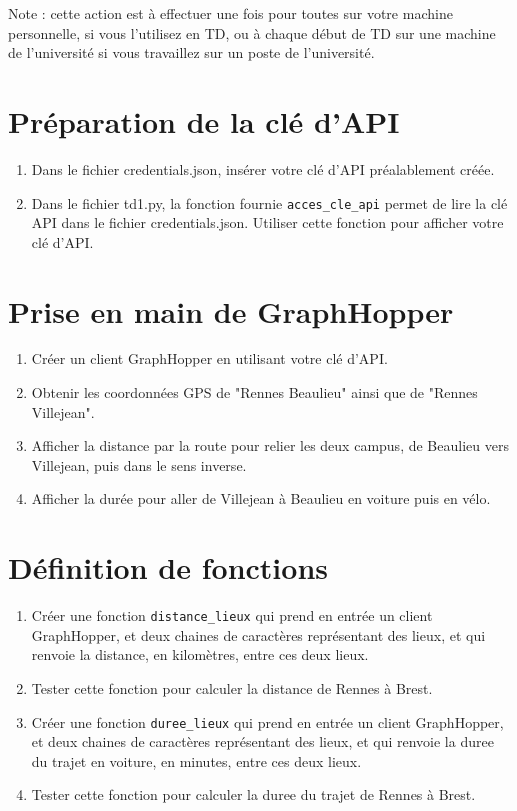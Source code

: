 \documentclass[11pt,a4paper]{article}
\begin{document}
Note : cette action est à effectuer une fois pour toutes sur votre machine personnelle, si vous l’utilisez en TD, ou à chaque début de TD sur une machine de l’université si vous travaillez sur un poste de l’université.

\section{Préparation de la clé d'API}
\begin{enumerate}
    \item Dans le fichier credentials.json, insérer votre clé d'API préalablement créée.
    \item Dans le fichier td1.py, la fonction fournie \verb+acces_cle_api+ permet de lire la clé API dans le fichier credentials.json. 
    Utiliser cette fonction pour afficher votre clé d'API.
\end{enumerate}
        
\section{Prise en main de GraphHopper}
\begin{enumerate}
    \item Créer un client GraphHopper en utilisant votre clé d'API.
    \item Obtenir les coordonnées GPS de "Rennes Beaulieu" ainsi que de "Rennes Villejean".
    \item Afficher la distance par la route pour relier les deux campus, de Beaulieu vers Villejean, puis dans le sens inverse.
    \item Afficher la durée pour aller de Villejean à Beaulieu en voiture puis en vélo. 
\end{enumerate}

\section{Définition de fonctions}
\begin{enumerate}
    \item Créer une fonction \verb+distance_lieux+ qui prend en entrée un client GraphHopper, et deux chaines de caractères représentant des lieux, et qui renvoie la distance, en kilomètres, entre ces deux lieux.
    \item Tester cette fonction pour calculer la distance de Rennes à Brest.
    \item Créer une fonction \verb+duree_lieux+ qui prend en entrée un client GraphHopper, et deux chaines de caractères représentant des lieux, et qui renvoie la duree du trajet en voiture, en minutes, entre ces deux lieux.
    \item Tester cette fonction pour calculer la duree du trajet de Rennes à Brest.
\end{enumerate}
\end{document}
